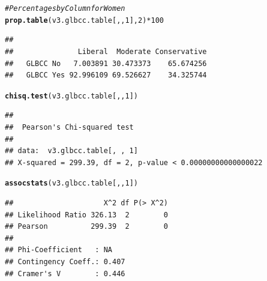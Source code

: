 \documentclass[11pt,openany]{book}\usepackage[]{graphicx}\usepackage[]{color}
\makeatletter
\newcommand{\hlnum}[1]{\textcolor[rgb]{0.686,0.059,0.569}{#1}}%
\newcommand{\hlcom}[1]{\textcolor[rgb]{0.678,0.584,0.686}{\textit{#1}}}%
\newcommand{\hlopt}[1]{\textcolor[rgb]{0,0,0}{#1}}%
\newcommand{\hlstd}[1]{\textcolor[rgb]{0.345,0.345,0.345}{#1}}%
\newcommand{\hlkwd}[1]{\textcolor[rgb]{0.737,0.353,0.396}{\textbf{#1}}}%
\newenvironment{kframe}{%
 \def\at@end@of@kframe{}%
 \ifinner\ifhmode%
  \def\at@end@of@kframe{\end{minipage}}%
  \begin{minipage}{\columnwidth}%
 \fi\fi%
 \def\FrameCommand##1{\hskip\@totalleftmargin \hskip-\fboxsep
 \colorbox{shadecolor}{##1}\hskip-\fboxsep
     \hskip-\linewidth \hskip-\@totalleftmargin \hskip\columnwidth}%
 \MakeFramed {\advance\hsize-\width
   \@totalleftmargin\z@ \linewidth\hsize
   \@setminipage}}%
 {\par\unskip\endMakeFramed%
 \at@end@of@kframe}
\newenvironment{knitrout}{}{} %
\renewenvironment{knitrout}{\begin{singlespace}}{\end{singlespace}}
\makeatother
\begin{document}
\begin{knitrout}
\color{fgcolor}\begin{kframe}
\begin{alltt}
\hlcom{# Percentages by Column for Women}
\hlkwd{prop.table}\hlstd{(v3.glbcc.table[, ,} \hlnum{1}\hlstd{],} \hlnum{2}\hlstd{)} \hlopt{*} \hlnum{100}
\end{alltt}
\begin{verbatim}
##            
##               Liberal  Moderate Conservative
##   GLBCC No   7.003891 30.473373    65.674256
##   GLBCC Yes 92.996109 69.526627    34.325744
\end{verbatim}
\begin{alltt}
\hlkwd{chisq.test}\hlstd{(v3.glbcc.table[, ,} \hlnum{1}\hlstd{])}
\end{alltt}
\begin{verbatim}
## 
## 	Pearson's Chi-squared test
## 
## data:  v3.glbcc.table[, , 1]
## X-squared = 299.39, df = 2, p-value < 0.00000000000000022
\end{verbatim}
\begin{alltt}
\hlkwd{assocstats}\hlstd{(v3.glbcc.table[, ,} \hlnum{1}\hlstd{])}
\end{alltt}
\begin{verbatim}
##                     X^2 df P(> X^2)
## Likelihood Ratio 326.13  2        0
## Pearson          299.39  2        0
## 
## Phi-Coefficient   : NA 
## Contingency Coeff.: 0.407 
## Cramer's V        : 0.446
\end{verbatim}
\end{kframe}
\end{knitrout}
\end{document}
